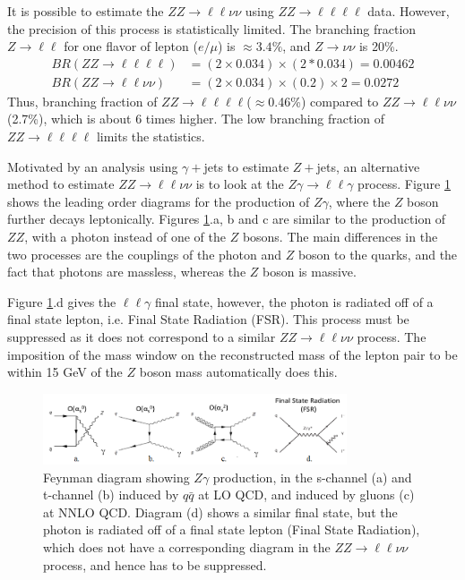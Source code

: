 \documentclass[11pt,a4paper,openright,twoside]{report}
\newcommand{\ZZ}{$ZZ\to \ell\ell\nu\nu$ }
\newcommand{\Zg}{$Z\gamma\to \ell\ell\gamma$ }
\begin{document}
It is possible to estimate the \ZZ using $ZZ\to \ell\ell\ell\ell$ data. However, the precision of this process is statistically limited. The branching fraction $Z\to\ell\ell$ for one flavor of lepton ($e/\mu$) is $\approx 3.4\%$, and $Z\to\nu\nu$ is 20\%. 
\begin{align}
BR(ZZ\to \ell\ell\ell\ell) &= (2\times 0.034)\times(2*0.034) = 0.00462\\
BR(ZZ\to \ell\ell\nu\nu) &= (2\times 0.034)\times(0.2)\times 2 = 0.0272
\end{align}
Thus, branching fraction of $ZZ\to \ell\ell\ell\ell$($\approx$0.46\%) compared to \ZZ (2.7\%), which is about 6 times higher. The low branching fraction of $ZZ\to \ell\ell\ell\ell$ limits the statistics.

Motivated by an analysis using $\gamma+$jets to estimate $Z+$jets\cite{gamma_jet}, an alternative method to estimate \ZZ is to look at the \Zg process. Figure \ref{fig:Zg} shows the leading order diagrams for the production of $Z\gamma$, where the $Z$ boson further decays leptonically. Figures \ref{fig:Zg}.a, b and c are similar to the production of $ZZ$, with a photon instead of one of the $Z$ bosons. The main differences in the two processes are the couplings of the photon and $Z$ boson to the quarks, and the fact that photons are massless, whereas the $Z$ boson is massive. 

Figure \ref{fig:Zg}.d gives the $\ell\ell\gamma$ final state, however, the photon is radiated off of a final state lepton, i.e. Final State Radiation (FSR). This process must be suppressed as it does not correspond to a similar \ZZ process. The imposition of the mass window on the reconstructed mass of the lepton pair to be within 15 GeV of the $Z$ boson mass automatically does this.

\begin{figure}[H]
\centering
		\includegraphics[width=0.8\textwidth]{Zg.png}
		\caption{Feynman diagram showing $Z\gamma$ production, in the s-channel (a) and t-channel (b) induced by $q\bar{q}$ at LO QCD, and induced by gluons (c) at NNLO QCD. Diagram (d) shows a similar final state, but the photon is radiated off of a final state lepton (Final State Radiation), which does not have a corresponding diagram in the \ZZ process, and hence has to be suppressed.}
		\label{fig:Zg}
\end{figure}
\end{document}
